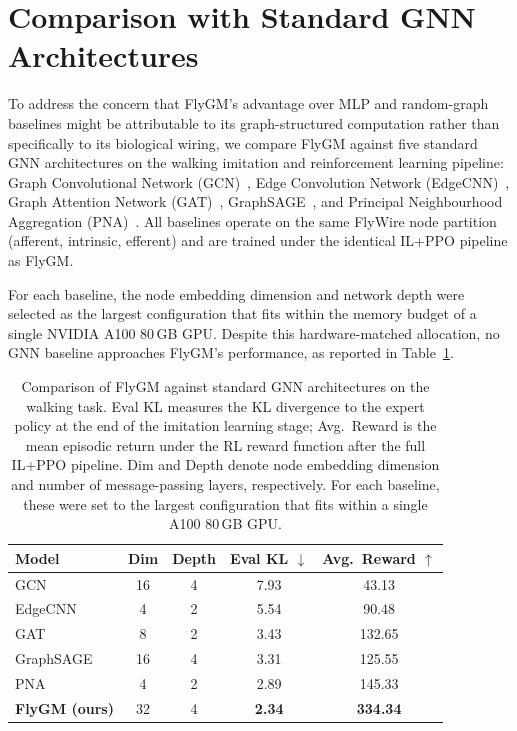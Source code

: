 \documentclass[a4paper]{easychair}
\begin{document}
\section{Comparison with Standard GNN Architectures}
\label{app:gnn_baselines}

To address the concern that FlyGM's advantage over MLP and random-graph baselines might be attributable to its graph-structured computation rather than specifically to its biological wiring, we compare FlyGM against five standard GNN architectures on the walking imitation and reinforcement learning pipeline: Graph Convolutional Network (GCN)~\citep{Kipf2017a}, Edge Convolution Network (EdgeCNN)~\citep{Wang2019}, Graph Attention Network (GAT)~\citep{Velickovic2018}, GraphSAGE~\citep{Hamilton2018}, and Principal Neighbourhood Aggregation (PNA)~\citep{Corso2020}. All baselines operate on the same FlyWire node partition (afferent, intrinsic, efferent) and are trained under the identical IL+PPO pipeline as FlyGM.

For each baseline, the node embedding dimension and network depth were selected as the largest configuration that fits within the memory budget of a single NVIDIA A100 80\,GB GPU. Despite this hardware-matched allocation, no GNN baseline approaches FlyGM's performance, as reported in Table~\ref{tab:gnn_baselines}.

\begin{table}[htbp]
\centering
\small
\setlength{\tabcolsep}{8pt}
\renewcommand{\arraystretch}{1.15}
\begin{tabular}{lcc cc}
\toprule
\textbf{Model} & \textbf{Dim} & \textbf{Depth} & \textbf{Eval KL} $\downarrow$ & \textbf{Avg.\ Reward} $\uparrow$ \\
\midrule
GCN         & 16 & 4 & 7.93 & 43.13 \\
EdgeCNN     & 4 & 2 & 5.54 & 90.48 \\
GAT         & 8 & 2 & 3.43 & 132.65 \\
GraphSAGE   & 16 & 4 & 3.31 & 125.55 \\
PNA         & 4 & 2 & 2.89 & 145.33 \\
\midrule
\textbf{FlyGM (ours)} & 32 & 4 & \textbf{2.34} & \textbf{334.34} \\
\bottomrule
\end{tabular}
\vspace{0.8em}
\caption{Comparison of FlyGM against standard GNN architectures on the walking task. Eval KL measures the KL divergence to the expert policy at the end of the imitation learning stage; Avg.\ Reward is the mean episodic return under the RL reward function after the full IL+PPO pipeline. Dim and Depth denote node embedding dimension and number of message-passing layers, respectively. For each baseline, these were set to the largest configuration that fits within a single A100 80\,GB GPU.}
\label{tab:gnn_baselines}
\end{table}
\end{document}
